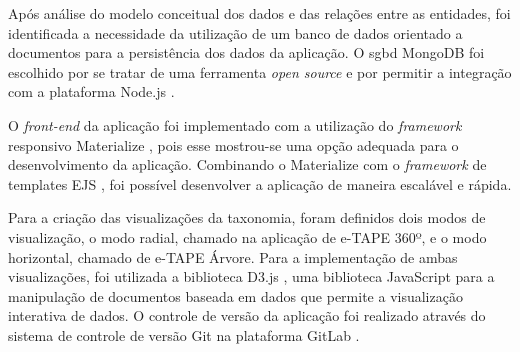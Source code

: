 \par
Após análise do modelo conceitual dos dados e das relações entre as entidades, foi identificada a necessidade da utilização de um banco de dados orientado a documentos para a 
persistência dos dados da aplicação. 
O \acrfull{sgbd} MongoDB foi escolhido por se tratar de uma ferramenta \textit{open source} e por permitir a integração com a plataforma Node.js 
\cite{mongodb}.

\par
O \textit{front-end} da aplicação foi implementado com a utilização do \textit{framework} responsivo Materialize \cite{materialize}, pois esse mostrou-se uma opção adequada para o desenvolvimento da aplicação. Combinando o Materialize com o \textit{framework} de templates EJS \cite{ejs}, 
foi possível desenvolver a aplicação de maneira escalável e rápida. 


\par
Para a criação das visualizações da taxonomia, foram definidos dois modos de visualização, o modo radial, chamado na aplicação de e-TAPE 360º, e o modo horizontal, 
chamado de e-TAPE Árvore. Para a implementação de ambas visualizações, foi utilizada a biblioteca D3.js \cite{d3js}, uma biblioteca JavaScript para a manipulação de documentos 
baseada em dados que permite a visualização interativa de dados. 
O controle de versão da aplicação foi realizado através do sistema de controle de versão Git na plataforma GitLab \cite{gitlab}.